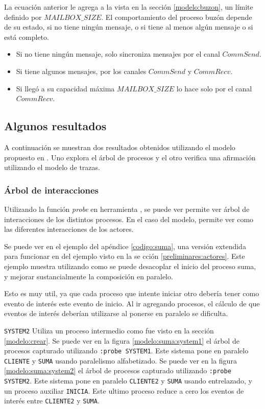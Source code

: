 La ecuación anterior le agrega a la vista en la sección \ref{modelo:buzon}, un límite definido por $MAILBOX\_SIZE$. El comportamiento del proceso buzón depende de su estado, si no tiene ningún mensaje, o si tiene al menos algún mensaje o si está completo.

\begin{itemize}
\item Si no tiene ningún mensaje, solo sincroniza mensajes por el canal $CommSend$.
\item Si tiene algunos mensajes, por los canales $CommSend$ y $CommRecv$.
\item Si llegó a su capacidad máxima $MAILBOX\_SIZE$ lo hace solo por el canal $CommRecv$.
\end{itemize}

\subsection{Algunos resultados}

A continuación se muestran dos resultados obtenidos utilizando el modelo propuesto en \CSP. Uno explora el árbol de procesos y el otro verifica una afirmación utilizando el modelo de trazas.

\subsubsection*{Árbol de interacciones}

Utilizando la función \textit{probe} en herramienta \FDR, se puede ver permite ver árbol de interacciones de los distintos procesos. En el caso del modelo, permite ver como las diferentes interacciones de los actores.

Se puede ver en el ejemplo del apéndice \ref{codigo:suma}, una versión extendida para funcionar en \FDR del ejemplo visto en la se cción \ref{preliminares:actores}. Este ejemplo muestra utilizando como se puede desacoplar el inicio del proceso suma, y mejorar sustancialmente la composición en paralelo. 

Esto es muy util, ya que cada proceso que intente iniciar otro debería tener como evento de interés este evento de inicio. Al ir agregando procesos, el cálculo de que eventos de interés deberían utilizarse al ponerse en paralelo se dificulta. 

\verb=SYSTEM2= Utiliza un proceso intermedio como fue visto en la sección \ref{modelo:crear}. Se puede ver en la figura \ref{modelo:suma:system1} el árbol de procesos capturado utilizando \verb=:probe SYSTEM1=. Este sistema pone en paralelo \verb-CLIENTE- y \verb-SUMA- usando paralelismo alfabetizado. Se puede ver en la figura \ref{modelo:suma:system2} el árbol de procesos capturado utilizando \verb=:probe SYSTEM2=. Este sistema pone en paralelo \verb-CLIENTE2- y \verb-SUMA- usando entrelazado, y un proceso auxiliar \verb-INICIA-. Este ultimo proceso reduce a cero los eventos de interés entre \verb-CLIENTE2- y \verb-SUMA-.

